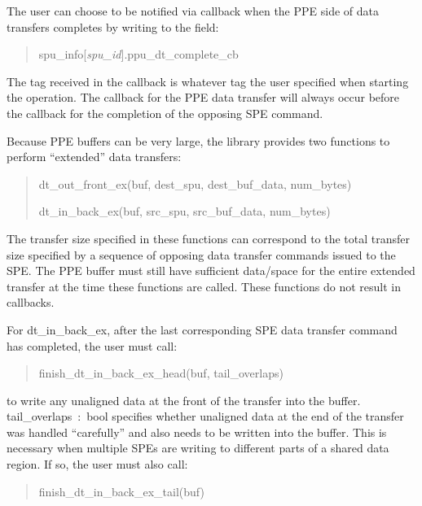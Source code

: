 The user can choose to be notified via callback when the PPE side of data transfers completes by writing to the field:
\begin{quote}
\textsf{spu\_info[\emph{spu\_id}].ppu\_dt\_complete\_cb}
\end{quote}
The tag received in the callback is whatever tag the user specified when starting the operation. The callback for the PPE data transfer will always occur before the callback for the completion of the opposing SPE command.

Because PPE buffers can be very large, the library provides two functions to perform ``extended'' data transfers:
\begin{quote}
\textsf{dt\_out\_front\_ex(buf, dest\_spu, dest\_buf\_data, num\_bytes)}

\textsf{dt\_in\_back\_ex(buf, src\_spu, src\_buf\_data, num\_bytes)}
\end{quote}
The transfer size specified in these functions can correspond to the total transfer size specified by a sequence of opposing data transfer commands issued to the SPE. The PPE buffer must still have sufficient data/space for the entire extended transfer at the time these functions are called. These functions do not result in callbacks.

For \textsf{dt\_in\_back\_ex}, after the last corresponding SPE data transfer command has completed, the user must call:
\begin{quote}
\textsf{finish\_dt\_in\_back\_ex\_head(buf, tail\_overlaps)}
\end{quote}
to write any unaligned data at the front of the transfer into the buffer. \textsf{tail\_overlaps~:~bool} specifies whether unaligned data at the end of the transfer was handled ``carefully'' and also needs to be written into the buffer. This is necessary when multiple SPEs are writing to different parts of a shared data region. If so, the user must also call:
\begin{quote}
\textsf{finish\_dt\_in\_back\_ex\_tail(buf)}
\end{quote}
